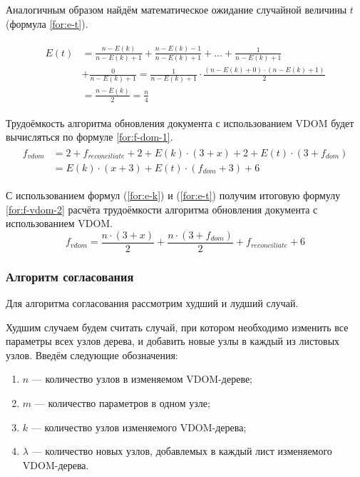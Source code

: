 Аналогичным образом найдём математическое ожидание случайной величины $t$ (формула \ref{for:e-t}).

\begin{align}
	\begin{split}
		\label{for:e-t}
		E(t) &= \frac{n - E(k)}{n - E(k) + 1} + \frac{n - E(k) - 1}{n - E(k) + 1} + \dotsc +  \frac{1}{n - E(k) + 1} \\
		&+\frac{0}{n - E(k) + 1} = \frac{1}{n - E(k) + 1} \cdot \frac{(n - E(k) + 0)\cdot(n - E(k) + 1)}{2}\\
		&= \frac{n - E(k)}{2} = \frac{n}{4}
	\end{split}
\end{align}

Трудоёмкость алгоритма обновления документа с использованием VDOM будет вычисляться по формуле \ref{for:f-dom-1}.
\begin{align}
	\begin{split}
	\label{for:f-vdom-1}
	f_{vdom} &= 2 + f_{reconciliate} + 2 + E(k)\cdot(3 + x) + 2 + E(t)\cdot(3 + f_{dom}) \\
	&= E(k) \cdot (x + 3) + E(t) \cdot (f_{dom} + 3) + 6
	\end{split}
\end{align}

С использованием формул (\ref{for:e-k}) и (\ref{for:e-t}) получим итоговую формулу \ref{for:f-vdom-2} расчёта трудоёмкости алгоритма обновления документа с использованием VDOM.
\begin{equation}
	\label{for:f-vdom-2}
	f_{vdom} = \frac{n \cdot (3 + x)}{2} + \frac{n\cdot(3 + f_{dom})}{2} + f_{reconciliate} + 6
\end{equation}


\subsubsection{Алгоритм согласования}

Для алгоритма согласования рассмотрим худший и лудший случай.

Худшим случаем будем считать случай, при котором необходимо изменить все параметры всех узлов дерева, и добавить новые узлы в каждый из листовых узлов.
Введём следующие обозначения:
\begin{enumerate}[label=\arabic*)]
	\item $n$ --- количество узлов в изменяемом VDOM-дереве;
	\item $m$ --- количество параметров в одном узле;
	\item $k$ --- количество узлов изменяемого VDOM-дерева;
	\item $\lambda$ --- количество новых узлов, добавлемых в каждый лист изменяемого VDOM-дерева.
\end{enumerate}

